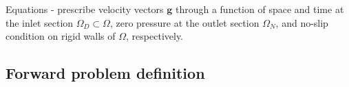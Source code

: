 Equations - prescribe velocity vectors $\mathbf{g}$ through a function of space and time at the inlet section $\Omega_D \subset \Omega$, zero pressure at the outlet section $\Omega_N$, and no-slip condition on rigid walls of $\Omega$, respectively.



\subsection*{Forward problem definition}

